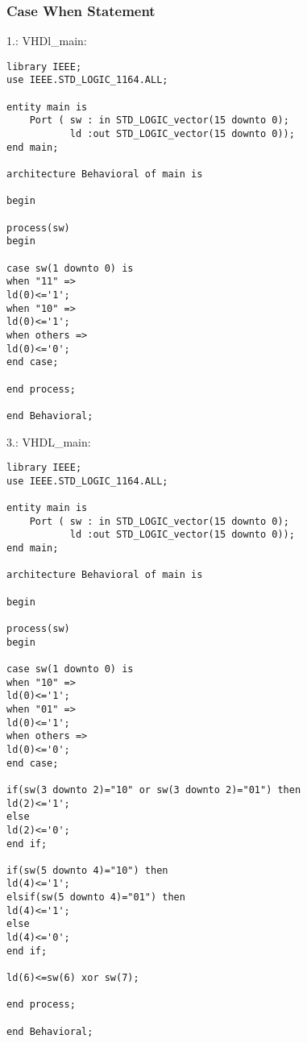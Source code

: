 \documentclass{article}
\begin{document}
\subsubsection{Case When Statement}
1.:\newline
VHDl\_main:\newline
\begin{verbatim}
library IEEE;
use IEEE.STD_LOGIC_1164.ALL;

entity main is
    Port ( sw : in STD_LOGIC_vector(15 downto 0);
           ld :out STD_LOGIC_vector(15 downto 0));
end main;

architecture Behavioral of main is

begin

process(sw)
begin

case sw(1 downto 0) is
when "11" =>
ld(0)<='1';
when "10" =>
ld(0)<='1';
when others =>
ld(0)<='0';
end case;

end process;

end Behavioral;
\end{verbatim}
3.:\newline
VHDL\_main:\newline
\begin{verbatim}
library IEEE;
use IEEE.STD_LOGIC_1164.ALL;

entity main is
    Port ( sw : in STD_LOGIC_vector(15 downto 0);
           ld :out STD_LOGIC_vector(15 downto 0));
end main;

architecture Behavioral of main is

begin

process(sw)
begin

case sw(1 downto 0) is
when "10" =>
ld(0)<='1';
when "01" =>
ld(0)<='1';
when others =>
ld(0)<='0';
end case;

if(sw(3 downto 2)="10" or sw(3 downto 2)="01") then
ld(2)<='1';
else
ld(2)<='0';
end if;

if(sw(5 downto 4)="10") then
ld(4)<='1';
elsif(sw(5 downto 4)="01") then
ld(4)<='1';
else
ld(4)<='0';
end if;

ld(6)<=sw(6) xor sw(7);

end process;

end Behavioral;
\end{verbatim}
\end{document}
